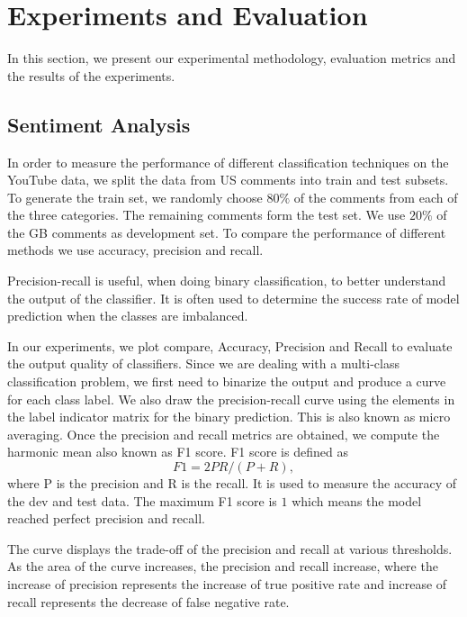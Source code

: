 \section{Experiments and Evaluation}
\label{sec:exp}
In this section, we present our experimental methodology, evaluation metrics and the results of the experiments.

\subsection{Sentiment Analysis}
\label{sec:sent-exp}
In order to measure the performance of different classification techniques on the YouTube data, we split the data from US comments into train and test subsets. To generate the train set, we randomly choose $80\%$ of the comments from each of the three categories. The remaining comments form the test set. We use $20\%$ of the GB comments as development set. 
To compare the performance of different methods we use accuracy, precision and recall. 

Precision-recall is useful, when doing binary classification, to better understand the output of the classifier. It is often used to determine the success rate of model prediction when the classes are imbalanced.  

In our experiments, we plot compare, Accuracy, Precision and Recall to evaluate the output quality of classifiers. 
Since we are dealing with a multi-class classification problem, we first need to binarize the output and produce a curve for each class label. 
We also draw the precision-recall curve using the elements in the label indicator matrix for the binary prediction. This is also known as micro averaging. 
Once the precision and recall metrics are obtained, we compute the harmonic mean also known as F1 score. F1 score is defined as 
\begin{equation}
F1 = 2PR / (P + R),
\label{eq:F1}
\end{equation}
where P is the precision and R is the recall.
It is used to measure the accuracy of the dev and test data. The maximum F1 score is $1$ which means the model reached perfect precision and recall.


The curve displays the trade-off of the precision and recall at various thresholds. As the area of the curve increases, the precision and recall increase, where the increase of precision represents the increase of true positive rate and increase of recall represents the decrease of false negative rate.


